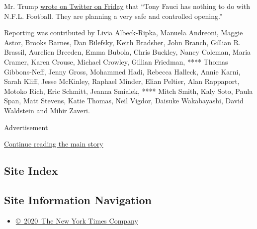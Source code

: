Mr. Trump
\href{https://twitter.com/realDonaldTrump/status/1274006223013249026}{wrote
on Twitter on Friday} that ``Tony Fauci has nothing to do with N.F.L.
Football. They are planning a very safe and controlled opening.''

Reporting was contributed by Livia Albeck-Ripka, Manuela Andreoni,
Maggie Astor, Brooks Barnes, Dan Bilefsky, Keith Bradsher, John Branch,
Gillian R. Brassil, Aurelien Breeden, Emma Bubola, Chris Buckley, Nancy
Coleman, Maria Cramer, Karen Crouse, Michael Crowley, Gillian Friedman,
**** Thomas Gibbons-Neff, Jenny Gross, Mohammed Hadi, Rebecca Halleck,
Annie Karni, Sarah Kliff, Jesse McKinley, Raphael Minder, Elian Peltier,
Alan Rappaport, Motoko Rich, Eric Schmitt, Jeanna Smialek, **** Mitch
Smith, Kaly Soto, Paula Span, Matt Stevens, Katie Thomas, Neil Vigdor,
Daisuke Wakabayashi, David Waldstein and Mihir Zaveri.

Advertisement

\protect\hyperlink{after-bottom}{Continue reading the main story}

\hypertarget{site-index}{%
\subsection{Site Index}\label{site-index}}

\hypertarget{site-information-navigation}{%
\subsection{Site Information
Navigation}\label{site-information-navigation}}

\begin{itemize}
\tightlist
\item
  \href{https://help.nytimes3xbfgragh.onion/hc/en-us/articles/115014792127-Copyright-notice}{©~2020~The
  New York Times Company}
\end{itemize}


